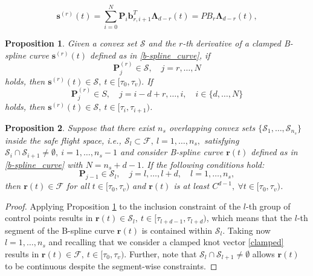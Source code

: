 \documentclass[10pt,a4paper]{amsart}
\newtheorem{proposition}{Proposition}
\newcommand{\vect}[1]{\boldsymbol{\mathbf{#1}}}
\begin{document}
\begin{equation}
    \vect{s}^{(r)}(t) = \sum_{i=0}^{N}\vect{P}_i\vect{b}_{r,i+1}^T\vect{\Lambda}_{d-r}(t) = PB_r\vect{\Lambda}_{d-r}(t),
    \label{b-spline_curve}
\end{equation}

\begin{proposition} \label{inclusion_prop}
Given a convex set $\mathcal{S}$ and the $r$-th derivative of a clamped B-spline curve $\vect{s}^{(r)}(t)$ defined as in \eqref{b-spline_curve}, if
\begin{equation}
     \vect{P}_{j}^{(r)} \in \mathcal{S}, \quad j=r,\ldots,N
    \label{inclusion_global}
\end{equation}
holds, then $\vect{s}^{(r)}(t) \in \mathcal{S}, \ t\in[\tau_0,\tau_v)$. If
\begin{equation}
    \vect{P}^{(r)}_j \in S, \quad j=i-d+r,\dots,i, \quad i\in\{d,\ldots,N\}
    \label{inclusion_local}
\end{equation}
holds, then $\vect{s}^{(r)}(t)\in \mathcal{S}, \ t\in[\tau_i,\tau_{i+1})$.
\end{proposition}

\begin{proposition} \label{convex_sets_prop}
Suppose that there exist $n_s$ overlapping convex sets $\{\mathcal{S}_1,\ldots,\mathcal{S}_{n_s}\}$ inside the safe flight space, i.e., $\mathcal{S}_l\subset \mathcal{F},\ l=1,\ldots,n_s,$ satisfying $\mathcal{S}_i\cap \mathcal{S}_{i+1}\neq \emptyset, \ i = 1,\ldots,n_s-1$ and consider B-spline curve $\vect{r}(t)$ defined as in \eqref{b-spline_curve} with $N=n_s+d-1$. If the following conditions hold:
\begin{equation}\label{eqobstc}
    \vect{P}_{j-1} \in \mathcal{S}_{l},\quad j = l,\ldots,l+d, \quad l = 1,\ldots,n_s,
\end{equation}
then  $\vect{r}(t)\in\mathcal{F}$  for all $t\in[\tau_0,\tau_v)$ and $\vect{r}(t)$ is at least $C^{d-1},\  \forall t\in[\tau_0,\tau_v)$.
\end{proposition}

\begin{proof} Applying Proposition \ref{inclusion_prop} to the inclusion constraint of the $l$-th  group of control points results in $\vect{r}(t)\in \mathcal{S}_l, \ t\in[\tau_{l+d-1},\tau_{l+d})$, which means that the $l$-th segment of the B-spline curve $\vect{r}(t)$ is contained within $\mathcal{S}_l$. Taking now $l=1,\ldots,n_s$ and recalling that we consider a clamped knot vector \eqref{clamped} results in $\vect{r}(t)\in\mathcal{F},\ t\in[\tau_0,\tau_v)$. Further, note that $\mathcal{S}_l\cap \mathcal{S}_{l+1} \neq \emptyset$ allows $\vect{r}(t)$ to be continuous despite the segment-wise constraints. 
\end{proof}
\end{document}
